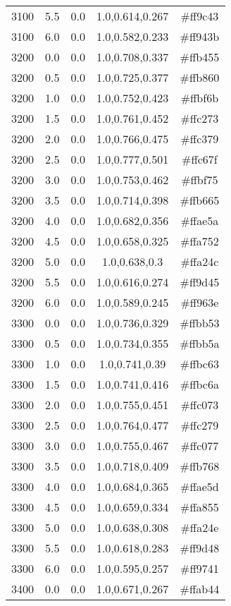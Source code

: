 \begin{tabular}{ccccc}
3100 & 5.5 & 0.0 & 1.0,0.614,0.267 & \#ff9c43 \\ 
3100 & 6.0 & 0.0 & 1.0,0.582,0.233 & \#ff943b \\ 
3200 & 0.0 & 0.0 & 1.0,0.708,0.337 & \#ffb455 \\ 
3200 & 0.5 & 0.0 & 1.0,0.725,0.377 & \#ffb860 \\ 
3200 & 1.0 & 0.0 & 1.0,0.752,0.423 & \#ffbf6b \\ 
3200 & 1.5 & 0.0 & 1.0,0.761,0.452 & \#ffc273 \\ 
3200 & 2.0 & 0.0 & 1.0,0.766,0.475 & \#ffc379 \\ 
3200 & 2.5 & 0.0 & 1.0,0.777,0.501 & \#ffc67f \\ 
3200 & 3.0 & 0.0 & 1.0,0.753,0.462 & \#ffbf75 \\ 
3200 & 3.5 & 0.0 & 1.0,0.714,0.398 & \#ffb665 \\ 
3200 & 4.0 & 0.0 & 1.0,0.682,0.356 & \#ffae5a \\ 
3200 & 4.5 & 0.0 & 1.0,0.658,0.325 & \#ffa752 \\ 
3200 & 5.0 & 0.0 & 1.0,0.638,0.3 & \#ffa24c \\ 
3200 & 5.5 & 0.0 & 1.0,0.616,0.274 & \#ff9d45 \\ 
3200 & 6.0 & 0.0 & 1.0,0.589,0.245 & \#ff963e \\ 
3300 & 0.0 & 0.0 & 1.0,0.736,0.329 & \#ffbb53 \\ 
3300 & 0.5 & 0.0 & 1.0,0.734,0.355 & \#ffbb5a \\ 
3300 & 1.0 & 0.0 & 1.0,0.741,0.39 & \#ffbc63 \\ 
3300 & 1.5 & 0.0 & 1.0,0.741,0.416 & \#ffbc6a \\ 
3300 & 2.0 & 0.0 & 1.0,0.755,0.451 & \#ffc073 \\ 
3300 & 2.5 & 0.0 & 1.0,0.764,0.477 & \#ffc279 \\ 
3300 & 3.0 & 0.0 & 1.0,0.755,0.467 & \#ffc077 \\ 
3300 & 3.5 & 0.0 & 1.0,0.718,0.409 & \#ffb768 \\ 
3300 & 4.0 & 0.0 & 1.0,0.684,0.365 & \#ffae5d \\ 
3300 & 4.5 & 0.0 & 1.0,0.659,0.334 & \#ffa855 \\ 
3300 & 5.0 & 0.0 & 1.0,0.638,0.308 & \#ffa24e \\ 
3300 & 5.5 & 0.0 & 1.0,0.618,0.283 & \#ff9d48 \\ 
3300 & 6.0 & 0.0 & 1.0,0.595,0.257 & \#ff9741 \\ 
3400 & 0.0 & 0.0 & 1.0,0.671,0.267 & \#ffab44 \\ 

\end{tabular}
